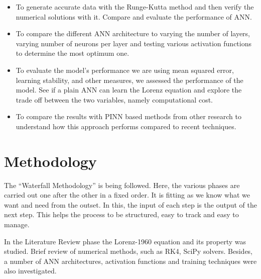\begin{itemize}
    \item To generate accurate data with the Runge-Kutta method and then verify the numerical solutions with it. Compare and evaluate the performance of ANN.
    
\end{itemize}

\begin{itemize}
    \item To compare the different ANN architecture to varying the number of layers, varying number of neurons per layer and testing various activation functions to determine the most optimum one.

\end{itemize}

\begin{itemize}
    \item To evaluate the model’s performance we are using mean squared error, learning stability, and other measures, we assessed the performance of the model. See if a plain ANN can learn the Lorenz equation and explore the trade off between the two variables, namely computational cost.

\end{itemize}

\begin{itemize}
    \item To compare the results with PINN based methods from other research to understand how this approach performs compared to recent techniques.
\end{itemize}


\section{Methodology}
The “Waterfall Methodology” is being followed. Here, the various phases are carried out one after the other in a fixed order. It is fitting as we know what we want and need from the outset. In this, the input of each step is the output of the next step. This helps the process to be structured, easy to track and easy to manage.
       
       
       
       In the Literature Review phase the Lorenz-1960 equation and its property was studied.
Brief review of numerical methods, such as RK4, SciPy solvers. Besides, a number of ANN architectures, activation functions and training techniques were also investigated.
     

